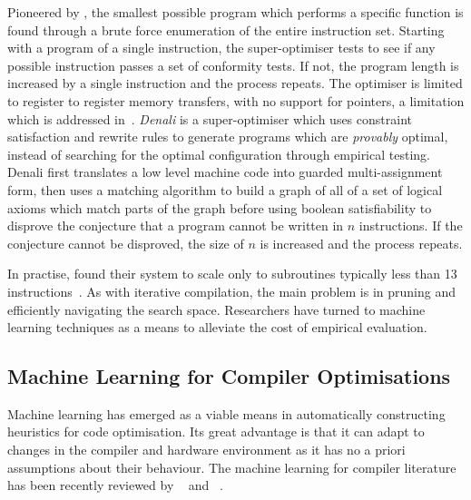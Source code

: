 Pioneered by \citeauthor{Massalin1987}, the smallest possible program which performs a specific function is found through a brute force enumeration of the entire instruction set. Starting with a program of a single instruction, the super-optimiser tests to see if any possible instruction passes a set of conformity tests. If not, the program length is increased by a single instruction and the process repeats. The optimiser is limited to register to register memory transfers, with no support for pointers, a limitation which is addressed in~\cite{Joshi2002}. \emph{Denali} is a super-optimiser which uses constraint satisfaction and rewrite rules to generate programs which are \emph{provably} optimal, instead of searching for the optimal configuration through empirical testing. Denali first translates a low level machine code into guarded multi-assignment form, then uses a matching algorithm to build a graph of all of a set of logical axioms which match parts of the graph before using boolean satisfiability to disprove the conjecture that a program cannot be written in $n$ instructions. If the conjecture cannot be disproved, the size of $n$ is increased and the process repeats.

In practise, \citeauthor{Massalin1987} found their system to scale only to subroutines typically less than 13 instructions~\cite{Massalin1987}. As with iterative compilation, the main problem is in pruning and efficiently navigating the search space. Researchers have turned to machine learning techniques as a means to alleviate the cost of empirical evaluation.


\subsection{Machine Learning for Compiler Optimisations}

Machine learning has emerged as a viable means in automatically constructing heuristics for code optimisation. Its great advantage is that it can adapt to changes in the compiler and hardware environment as it has no a priori assumptions about their behaviour.
The machine learning for compiler literature has been recently reviewed by \citeauthor{Ashouri2018}~\cite{Ashouri2018} and
\citeauthor{Zhang2018c}~\cite{Zhang2018c}.

